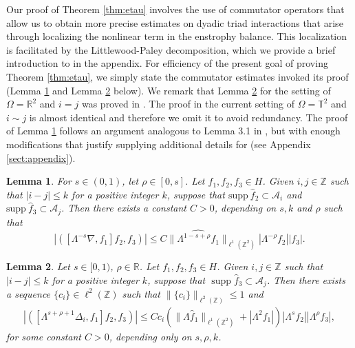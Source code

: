 \documentclass[twoside, reqno]{amsart}
\newtheorem{lemma}{Lemma}
\numberwithin{lemma}{section}
\numberwithin{theorem}{section}
\numberwithin{proposition}{section}
\numberwithin{equation}{section} %
\newcommand{\la}{\Lambda}
\newcommand{\Acal}{\mathcal{A}}
\newcommand{\lbn}{\left (}
\newcommand{\rbn}{\right )}
\newcommand{\Sob}[2]{\lVert#1\rVert_{#2}}
\newcommand{\ZZ}{\mathbb{Z}}
\newcommand{\Lam}{\Lambda}
\newcommand{\tht}{\theta}
\newcommand{\vm}[1]{\textcolor{olive}{\textsf{[COMMENT FROM VINCENT: #1]}}}
\DeclareMathOperator{\supp}{supp}
\begin{document}
{Our} proof of Theorem \ref{thm:etau} involves {the use of commutator operators that allow us to obtain more precise estimates on dyadic triad interactions that arise through localizing the nonlinear term in the enstrophy balance. This localization is facilitated by the Littlewood-Paley decomposition, which we} provide a brief introduction to 
in the appendix. {For efficiency of the present goal of proving Theorem \ref{thm:etau}, we simply state the commutator estimates invoked its proof (Lemma \ref{JKM22lemma} and Lemma \ref{lem:commutator4} below). We remark that} Lemma \ref{lem:commutator4} for the setting of $\Omega=\mathbb{R}^2$ and $i=j$ was proved in \cite{JKM2022}. The proof in the current setting of $\Omega=\mathbb{T}^2$ and $i\sim j$ is almost identical and therefore we omit it to avoid redundancy. The proof of Lemma \ref{JKM22lemma} follows an argument analogous to Lemma 3.1 in \cite{JKM2022}, but with enough modifications {that justify supplying additional details for (see Appendix \ref{sect:appendix})}. 

\begin{lemma}%
\label{JKM22lemma}
    For $s\in (0,1)$, let $\rho \in [0,s]$. Let $f_1,f_2,f_3\in H$. Given $i, j\in \mathbb{Z}$ such that $|i-j|\le k$ for a positive integer $k$, suppose that $\text{supp} \ \hat{f}_2\subset \mathcal{A}_i$ and $\text{supp} \ \hat{f}_3\subset \mathcal{A}_j$. Then there exists a constant $C>0$, depending on $s,k$ and $\rho$ such that
    \[|\lbn [\la^{-s}\nabla,f_1]f_2,f_3\rbn|\le C\Sob{\widehat{\la^{1-s+\rho} f_1}}{\ell^1(\ZZ^2)}|\la^{-\rho}f_2||f_3|.\]
\end{lemma}
    \begin{lemma}\label{lem:commutator4}
Let $s \in [0,1)$, $\rho \in \mathbb{R}$. Let $f_1,f_2,f_3\in H$. Given $i, j\in \mathbb{Z}$ such that $|i-j|\le k$ for a positive integer $k$, suppose that $\supp\hat{f}_3\subset{\Acal}_j$. Then there exists a sequence $\{c_i\}\in\ell^2(\ZZ)$ such that $\Sob{\{c_i\}}{\ell^2(\mathbb{Z})}\leq1$ and
    \begin{align*}
        |([\Lam^{s+\rho+1}\Delta_i,f_1]f_2,f_3)|\leq Cc_{i}
              (\Sob{\Lam \widehat{f}_1}{\ell^1(\ZZ^2)}+|\Lam^2f_1|)|\Lam^sf_2||\Lam^\rho f_3|,
    \end{align*}     
for some constant $C>0$, depending only on $s,\rho,k$. 
\end{lemma}
\end{document}
